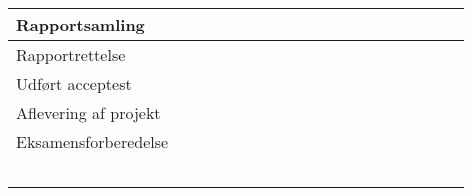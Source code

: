 \documentclass[12pt, letterpaper]{article}
\begin{document}
\begin{table}[]
\begin{tabular}{|l|l|l|l|l|l|l|l|l|l|l|l|l|l|l|l|l|l|l|}
Rapportsamling          &    &    &    &    &    &    &    &    &    &    &    &    &    &    &    &  &  &  \\ \hline
Rapportrettelse         &    &    &    &    &    &    &    &    &    &    &    &    &    &    &    &  &  &  \\ \hline
Udført acceptest        &    &    &    &    &    &    &    &    &    &    &    &    &    &    &    &  &  &  \\ \hline
Aflevering af projekt   &    &    &    &    &    &    &    &    &    &    &    &    &    &    &    &  &  &  \\ \hline
Eksamensforberedelse    &    &    &    &    &    &    &    &    &    &    &    &    &    &    &    &  &  &  \\ \hline
                        &    &    &    &    &    &    &    &    &    &    &    &    &    &    &    &  &  &  \\ \hline
                        &    &    &    &    &    &    &    &    &    &    &    &    &    &    &    &  &  &  \\ \hline
                        &    &    &    &    &    &    &    &    &    &    &    &    &    &    &    &  &  &  \\ \hline
                        &    &    &    &    &    &    &    &    &    &    &    &    &    &    &    &  &  &  \\ \hline
                        &    &    &    &    &    &    &    &    &    &    &    &    &    &    &    &  &  &  \\ \hline
\end{tabular}
\end{table}
\end{document}

